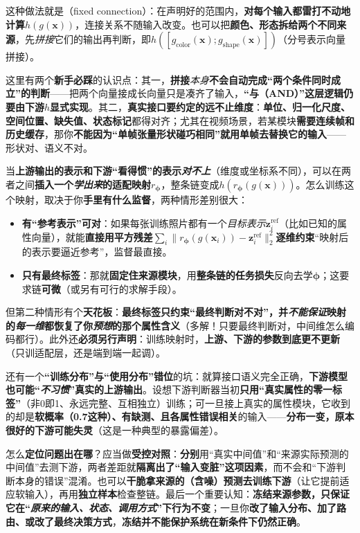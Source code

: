 这种做法就是（fixed connection）：在声明好的范围内，\textbf{对每个输入都雷打不动地计算}$h(g(\bm{x}))$，连接关系不随输入改变。也可以把\textbf{颜色、形态拆给两个不同来源}，先\emph{拼接}它们的输出再判断，即$h([g_{\mathrm{color}}(\bm{x});g_{\mathrm{shape}}(\bm{x})])$（分号表示向量拼接）。

这里有两个\textbf{新手必踩}的认识点：其一，\textbf{拼接}\emph{本身}\textbf{不会自动完成“两个条件同时成立”的判断}——把两个向量接成长向量只是凑齐了输入，\textbf{“与（AND）”这层逻辑仍要由下游}$h$\textbf{显式实现}。其二，\textbf{真实接口要约定的远不止维度}：\textbf{单位、归一化尺度、空间位置、缺失值、状态标记}都得对齐；尤其在视频场景，若某模块\textbf{需要连续帧和历史缓存}，那你\textbf{不能因为“单帧张量形状碰巧相同”就用单帧去替换它的输入}——形状对、语义不对。

当\textbf{上游输出的表示和下游“看得惯”的表示\emph{对不上}}（维度或坐标系不同），可以在两者之间\textbf{插入一个\emph{学出来}的适配映射}$r_{\bm{\phi}}$，整条链变成$h(r_{\bm{\phi}}(g(\bm{x})))$。怎么训练这个映射，取决于你\textbf{手里有什么监督}，两种情形差别很大：
\begin{itemize}\item \textbf{有“参考表示”可对}：如果每张训练照片都有一个\emph{目标表示}$\bm{z}^{\mathrm{ref}}_i$（比如已知的属性向量），就能\textbf{直接用平方残差}$\sum_i\lVert r_{\bm{\phi}}(g(\bm{x}_i))-\bm{z}^{\mathrm{ref}}_i\rVert_2^2$\textbf{逐维约束}“映射后的表示要逼近参考”，监督最直接。\item \textbf{只有最终标签}：那就\textbf{固定住来源模块}，用\textbf{整条链的任务损失}反向去学$\bm{\phi}$；这要求链\textbf{可微}（或另有可行的求解手段）。\end{itemize}
但第二种情形有个\textbf{天花板}：\textbf{最终标签只约束“最终判断对不对”，并\emph{不能保证}映射的\emph{每一维}都恢复了你\emph{预想}的那个属性含义}（多解！只要最终判断对，中间维怎么编码都行）。此外还\textbf{必须另行声明}：训练映射时，\textbf{上游、下游的参数到底更不更新}（只训适配层，还是端到端一起调）。

还有一个\textbf{“训练分布”与“使用分布”错位}的坑：就算接口语义完全正确，\textbf{下游模型也可能“\emph{不习惯}”真实的上游输出}。设想下游判断器当初\textbf{只用“真实属性的零一标签”}（非0即1、永远完整、互相独立）训练；可一旦接上真实的属性模块，它收到的却是\textbf{软概率（0.7这种）、有缺测、且各属性错误相关}的输入——\textbf{分布一变，原本很好的下游可能失灵}（这是一种典型的暴露偏差）。

怎么\textbf{定位问题出在哪}？应当做\textbf{受控对照}：\textbf{分别}用“真实中间值”和“来源实际预测的中间值”去测下游，两者差距就\textbf{隔离出了“输入变脏”这项因素}，而不会和“下游判断本身的错误”混淆。也可以\textbf{干脆拿来源的（含噪）预测去训练下游}（让它提前适应软输入），再用\textbf{独立样本}检查整链。最后一个重要认知：\textbf{冻结来源参数，只保证它在“\emph{原来的输入、状态、调用方式}”下行为不变}；一旦你\textbf{改了输入分布、加了路由、或改了最终决策方式}，\textbf{冻结并不能保护系统在新条件下仍然正确}。

